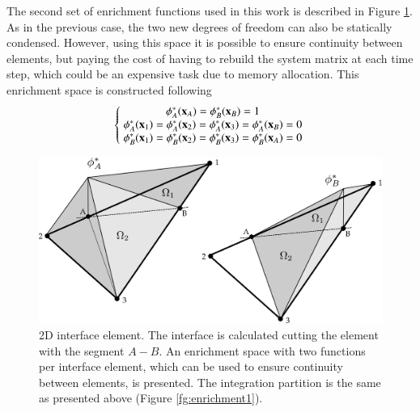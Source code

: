 The second set of enrichment functions used in this work is described in Figure \ref{fg:enrichment2}. As in the previous case, the two new degrees of freedom can also be statically condensed. However, using this space it is possible to ensure continuity between elements, but paying the cost of having to rebuild the system matrix at each time step, which could be an expensive task due to memory allocation.
This enrichment space is constructed following
\begin{equation}
   \left\{\;
   \begin{matrix}
     \phi_A^*(\mathbf{x}_A)=\phi_B^*(\mathbf{x}_B)=1 \\
     \phi_A^*(\mathbf{x}_1)=\phi_A^*(\mathbf{x}_2)=\phi_A^*(\mathbf{x}_3)=\phi_A^*(\mathbf{x}_B)=0 \\
     \phi_B^*(\mathbf{x}_1)=\phi_B^*(\mathbf{x}_2)=\phi_B^*(\mathbf{x}_3)=\phi_B^*(\mathbf{x}_A)=0
   \end{matrix}\;
   \right.
   \label{eq:enrich-2a}
\end{equation}

\begin{figure}[H]
  \centering
   \includegraphics[width=.9\columnwidth]{images/enrichment2.pdf}
   \caption{2D interface element. The interface is calculated cutting the element with the segment $A-B$. An enrichment space with two functions per interface element, which can be used to ensure continuity between elements, is presented. The integration partition is the same as presented above (Figure \ref{fg:enrichment1}).}
   \label{fg:enrichment2}
\end{figure}


